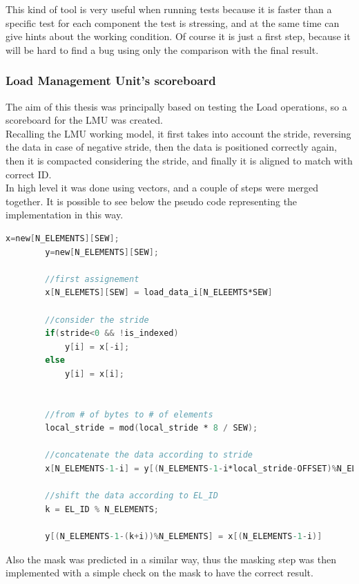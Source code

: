 This kind of tool is very useful when running tests because it is faster than a specific test for each component the test is stressing, and at the same time can give hints about the working condition. Of course it is just a first step, because it will be hard to find a bug using only the comparison with the final result.\\

\subsubsection{Load Management Unit's scoreboard}
The aim of this thesis was principally based on testing the Load operations, so a scoreboard for the LMU was created.\\

Recalling the LMU working model, it first takes into account the stride, reversing the data in case of negative stride, then the data is positioned correctly again, then it is compacted considering the stride, and finally it is aligned to match with correct ID.\\

In high level it was done using vectors, and a couple of steps were merged together. It is possible to see below the pseudo code representing the implementation in this way.

\linespread{1}
\begin{lstlisting}[language=Verilog,style=verilog-style, backgroundcolor=\color{lyel_palette}, frame=tlb]
        x=new[N_ELEMENTS][SEW];
        y=new[N_ELEMENTS][SEW];

        //first assignement
        x[N_ELEMETS][SEW] = load_data_i[N_ELEEMTS*SEW]

        //consider the stride
        if(stride<0 && !is_indexed)
            y[i] = x[-i];
        else
            y[i] = x[i];
        

        //from # of bytes to # of elements
        local_stride = mod(local_stride * 8 / SEW);

        //concatenate the data according to stride 
        x[N_ELEMENTS-1-i] = y[(N_ELEMENTS-1-i*local_stride-OFFSET)%N_ELEMENTS];

        //shift the data according to EL_ID
        k = EL_ID % N_ELEMENTS;
        
        y[(N_ELEMENTS-1-(k+i))%N_ELEMENTS] = x[(N_ELEMENTS-1-i)]
\end{lstlisting}
\linespread{1.2}

Also the mask was predicted in a similar way, thus the masking step was then implemented with a simple check on the mask to have the correct result.\\

